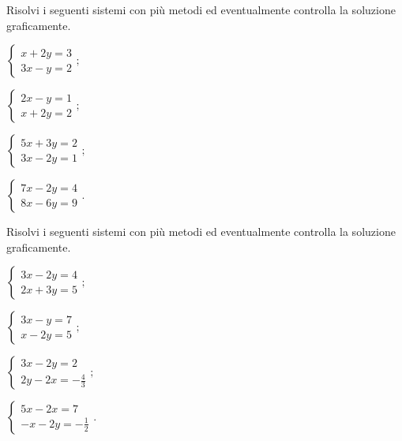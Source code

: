 \begin{esercizio}[\Ast]
 \label{ese:21.70}
 Risolvi i seguenti sistemi con più metodi ed eventualmente controlla
la soluzione graficamente.
\begin{multicols}{2}
\begin{enumeratea}
\item $\left\{\begin{array}{l}x+2y=3 \\3x-y=2\end{array}\right.;$
\item $\left\{\begin{array}{l}2x-y=1 \\x+2y=2\end{array}\right.;$
\item $\left\{\begin{array}{l}5x+3y=2 \\3x-2y=1\end{array}\right.;$
\item $\left\{\begin{array}{l}7x-2y=4\\8x-6y=9 \end{array}\right..$
\end{enumeratea}
\end{multicols}
\end{esercizio}

\begin{esercizio}[\Ast]
 \label{ese:21.71}
 Risolvi i seguenti sistemi con più metodi ed eventualmente controlla
la soluzione graficamente.
\begin{multicols}{2}
\begin{enumeratea}
\item $\left\{\begin{array}{l}3x-2y=4 \\2x+3y=5\end{array}\right.;$
\item $\left\{\begin{array}{l}3x-y=7 \\x-2y=5 \end{array}\right.;$
\item $\left\{\begin{array}{l}3x-2y=2\\2y-2x=-{\frac{4}{3}} \end{array}\right.;$
\item $\left\{\begin{array}{l}5x-2x=7\\-x-2y=-{\frac{1}{2}} \end{array}\right..$
\end{enumeratea}
\end{multicols}
\end{esercizio}

